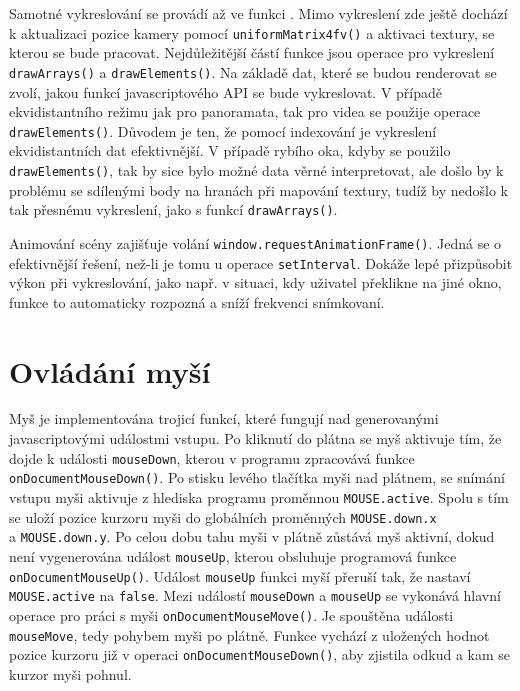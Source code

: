 Samotné vykreslování se provádí až ve funkci \texttt{\render}. Mimo vykreslení zde ještě dochází k aktualizaci pozice kamery pomocí \texttt{uniformMatrix4fv()} a aktivaci textury, se kterou se bude pracovat. Nejdůležitější částí funkce \texttt{\render} jsou operace pro vykreslení \texttt{drawArrays()} a \texttt{drawElements()}. Na základě dat, které se budou renderovat se zvolí, jakou funkcí javascriptového API se bude vykreslovat. V případě ekvidistantního režimu jak pro panoramata, tak pro videa se použije operace  \texttt{drawElements()}. Důvodem je ten, že pomocí indexování je vykreslení ekvidistantních dat efektivnější. V případě rybího oka, kdyby se použilo \texttt{drawElements()}, tak by sice bylo možné data věrné interpretovat, ale došlo by k problému se sdílenými body na hranách při mapování textury, tudíž by nedošlo k tak přesnému vykreslení, jako s funkcí \texttt{drawArrays()}.

Animování scény zajišťuje volání \texttt{window.requestAnimationFrame()}. Jedná se o efektivnější řešení, než-li je tomu u operace \texttt{setInterval}. Dokáže lepé přizpůsobit výkon při vykreslování, jako např. v situaci, kdy uživatel překlikne na jiné okno, funkce to automaticky rozpozná a sníží frekvenci snímkovaní.



\section{Ovládání myší}
Myš je implementována trojicí funkcí, které fungují nad generovanými javascriptovými událostmi vstupu. Po kliknutí do plátna se myš aktivuje tím, že dojde k události \texttt{mouseDown}, kterou v programu zpracovává funkce \texttt{onDocumentMouseDown()}. Po stisku levého tlačítka myši nad plátnem, se snímání vstupu myši aktivuje z hlediska programu proměnnou \texttt{MOUSE.active}. Spolu s tím se uloží pozice kurzoru myši do globálních proměnných \texttt{MOUSE.down.x}\\ a \texttt{MOUSE.down.y}. Po celou dobu tahu myši v plátně zůstává myš aktivní, dokud není vygenerována událost \texttt{mouseUp}, kterou obsluhuje programová funkce \texttt{onDocumentMouseUp()}. Událost \texttt{mouseUp} funkci myší přeruší tak, že nastaví \texttt{MOUSE.active} na \texttt{false}. Mezi událostí \texttt{mouseDown} a \texttt{mouseUp} se vykonává hlavní operace pro práci s myši \texttt{onDocumentMouseMove()}. Je spouštěna události \texttt{mouseMove}, tedy pohybem myši po plátně. Funkce vychází z uložených hodnot pozice kurzoru již v operaci \texttt{onDocumentMouseDown()}, aby zjistila odkud a kam se kurzor myši pohnul. 


